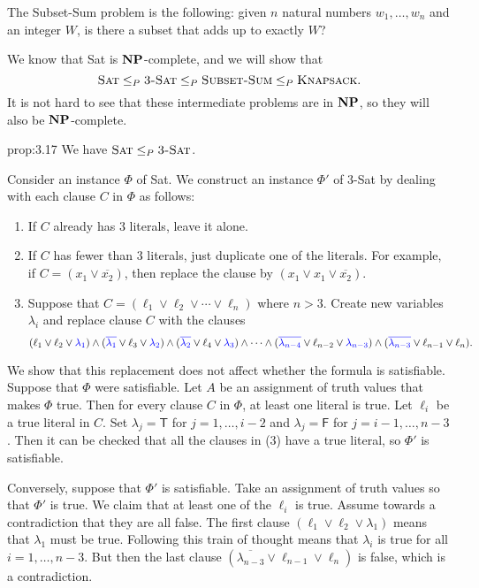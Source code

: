 The {\sc Subset-Sum} problem is the following: given $n$ natural numbers 
$w_1, \dots, w_n$ and an integer $W$, is there a subset that adds up to 
exactly $W$?

We know that {\sc Sat} is $\operatorname{\textbf{NP}}$-complete, and we will show that 
\[ \textsc{Sat} \leq_P \textsc{3-Sat} \leq_P \textsc{Subset-Sum} \leq_P 
\textsc{Knapsack}. \] 
It is not hard to see that these intermediate problems are in $\operatorname{\textbf{NP}}$, 
so they will also be $\operatorname{\textbf{NP}}$-complete. 

\begin{prop}{prop:3.17}
    We have $\textsc{Sat} \leq_P \textsc{3-Sat}$.
\end{prop}
\begin{pf}
    Consider an instance $\Phi$ of {\sc Sat}. We construct an instance $\Phi'$ of 
    {\sc $3$-Sat} by dealing with each clause $C$ in $\Phi$ as follows:
    \begin{enumerate}[(1)]
        \item If $C$ already has $3$ literals, leave it alone. 
        \item If $C$ has fewer than $3$ literals, just duplicate one of the 
        literals. For example, if $C = (x_1 \vee \overline{x_2})$, then 
        replace the clause by $(x_1 \vee x_1 \vee \overline{x_2})$. 
        \item Suppose that $C = (\ell_1 \vee \ell_2 \vee \cdots \vee \ell_n)$ 
        where $n > 3$. Create new variables $\lambda_i$ and replace clause 
        $C$ with the clauses 
        \[ (\ell_1 \vee \ell_2 \vee {\color{blue} \lambda_1}) 
        \wedge ({\color{blue} \overline{\lambda_1}} \vee \ell_3 \vee 
        {\color{blue} \lambda_2}) \wedge ({\color{blue} \overline{\lambda_2}} 
        \vee \ell_4 \vee {\color{blue} \lambda_3}) \wedge \cdots 
        \wedge ({\color{blue} \overline{\lambda_{n-4}}} \vee \ell_{n-2} \vee
        {\color{blue} \lambda_{n-3}}) \wedge ({\color{blue} 
        \overline{\lambda_{n-3}}} \vee \ell_{n-1} \vee \ell_n). \] 
    \end{enumerate}
    We show that this replacement does not affect whether the formula is 
    satisfiable. Suppose that $\Phi$ were satisfiable. Let $A$ be 
    an assignment of truth values that makes $\Phi$ true. Then for 
    every clause $C$ in $\Phi$, at least one literal is true. Let 
    $\ell_i$ be a true literal in $C$. Set $\lambda_j = \textsf{T}$ for 
    $j = 1, \dots, i-2$ and $\lambda_j = \textsf{F}$ for $j = i-1, \dots, 
    n-3$. Then it can be checked that all the clauses in (3) have a true 
    literal, so $\Phi'$ is satisfiable. 

    Conversely, suppose that $\Phi'$ is satisfiable. Take an assignment 
    of truth values so that $\Phi'$ is true. We claim that at least one of 
    the $\ell_i$ is true. Assume towards a contradiction that they are all 
    false. The first clause $(\ell_1 \vee \ell_2 \vee \lambda_1)$ means that 
    $\lambda_1$ must be true. Following this train of thought means that 
    $\lambda_i$ is true for all $i = 1, \dots, n-3$. But then the last 
    clause $(\overline{\lambda_{n-3}} \vee \ell_{n-1} \vee \ell_n)$ is 
    false, which is a contradiction. 
\end{pf}

